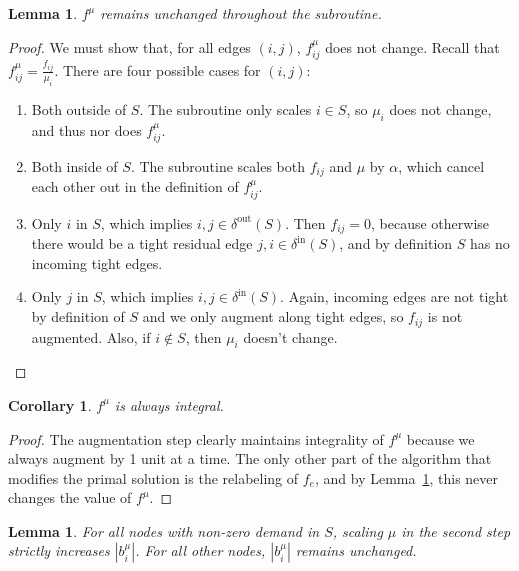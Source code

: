 \documentclass[11pt]{article}
\newtheorem{corollary}{Corollary}[theorem]
\newtheorem{lemma}[theorem]{Lemma}
\theoremstyle{definition}
\theoremstyle{definition}
\newcommand{\biu}{b_{i}^{\mu}}
\newcommand{\din}{\delta^{\text{in}}}
\newcommand{\dout}{\delta^{\text{out}}}
\newcommand{\fiju}{f_{ij}^{\mu}}
\newcommand{\todo}[1]{}%
\begin{document}
    \begin{lemma}
    $f^{\mu}$ remains unchanged throughout the subroutine.
    \label{lem:fsame}
    \end{lemma} 
    \begin{proof}
        We must show that, for all edges $(i,j)$, $f_{ij}^{\mu}$ does not change.
        Recall that $f_{ij}^{\mu} = \frac{f_{ij}}{\mu_i}$. There
        are four possible cases for $(i, j)$:
        \begin{enumerate}
            \item Both outside of $S$. The subroutine only scales $i \in S$, so $\mu_i$ 
                does not change, and thus nor does $\fiju$.
            \item Both inside of $S$. The subroutine scales both $f_{ij}$ and $\mu$ by
                $\alpha$, which cancel each other out in the definition of $\fiju$.
            \item Only $i$ in $S$, which implies $i,j \in \dout(S)$. Then $f_{ij}=0$,
                because otherwise there would be a tight residual edge $j,i \in \din(S)$,
                and by definition $S$ has no incoming tight edges.
            \item Only $j$ in $S$, which implies $i,j \in \din(S)$. Again, incoming edges
                are not tight by definition of $S$ and we only augment along tight edges,
                so $f_{ij}$ is not augmented. Also, if $i \notin S$, then $\mu_i$ doesn't
                change. \qedhere
        \end{enumerate}
    \end{proof}
    \begin{corollary}
    $f^{\mu}$ is always integral.
    \end{corollary}
    \begin{proof}
    The augmentation step clearly maintains integrality of $f^{\mu}$ because we
    always augment by 1 unit at a time. The only other part of the algorithm that
    modifies the primal solution is the relabeling of $f_e$, and by
    Lemma~\ref{lem:fsame}, this never changes the value of $f^{\mu}$.
    \end{proof}
    \begin{lemma}
        \label{lem:scaling}
        For all nodes with non-zero demand in $S$, scaling $\mu$ in the second step
        strictly increases $|\biu|$. For all other nodes, $|\biu|$ remains unchanged.
        \todo{Show S cannot be empty?}
    \end{lemma}
\end{document}
